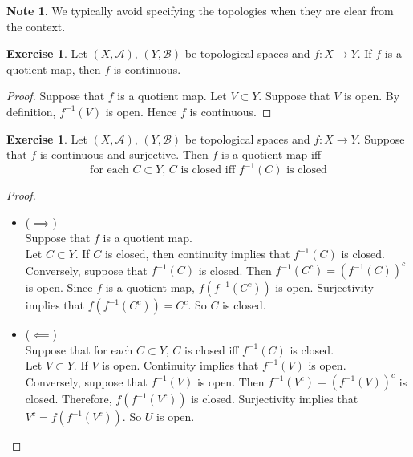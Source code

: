 \documentclass[12pt]{amsart}
\theoremstyle{definition}
\newtheorem{note}[definition]{Note}
\newtheorem{ex}[definition]{Exercise}
\newcommand{\MA}{\mathcal{A}}
\newcommand{\MB}{\mathcal{B}}
\newcommand{\lex}[1]{\label{ex:#1}}
\begin{document}
	\begin{note}
	We typically avoid specifying the topologies when they are clear from the context.
	\end{note}
	
	\begin{ex} \lex{34002}
	Let $(X, \MA)$, $(Y, \MB)$ be topological spaces and $f:X \rightarrow Y$. If $f$ is a quotient map, then $f$ is continuous.
	\end{ex}
	
	\begin{proof}
	Suppose that $f$ is a quotient map. Let $V \subset Y$. Suppose that $V$ is open. By definition, $f^{-1}(V)$ is open. Hence $f$ is continuous.  
	\end{proof}
	
	\begin{ex} \lex{34003}
	Let $(X, \MA)$, $(Y, \MB)$ be topological spaces and $f:X \rightarrow Y$. Suppose that $f$ is continuous and surjective. Then $f$ is a quotient map iff 
	\begin{equation*}
	\text{for each $C \subset Y$, $C$ is closed iff $f^{-1}(C)$ is closed} 
	\end{equation*}	
	\end{ex}
	
	\begin{proof}\
	\begin{itemize}
	\item ($\implies$) \\
	Suppose that $f$ is a quotient map.\\
	Let $C \subset Y$. If $C$ is closed, then continuity implies that $f^{-1}(C)$ is closed.\\ 
	Conversely, suppose that $f^{-1}(C)$ is closed. Then $f^{-1}(C^c) = (f^{-1}(C))^c$ is open. Since $f$ is a quotient map, $f(f^{-1}(C^c))$ is open. Surjectivity implies that $f(f^{-1}(C^c)) = C^c$. So $C$ is closed. 
	\item ($\impliedby$) \\
	Suppose that for each $C \subset Y$, $C$ is closed iff $f^{-1}(C)$ is closed. \\
	Let $V \subset Y$. If $V$ is open. Continuity implies that $f^{-1}(V)$ is open.\\ 
	Conversely, suppose that $f^{-1}(V)$ is open. Then $ f^{-1}(V^c) = (f^{-1}(V))^c$ is closed. Therefore, $f(f^{-1}(V^c))$ is closed. Surjectivity implies that $V^c = f(f^{-1}(V^c))$. So $U$ is open.
	\end{itemize}
	\end{proof}
	
\end{document}
